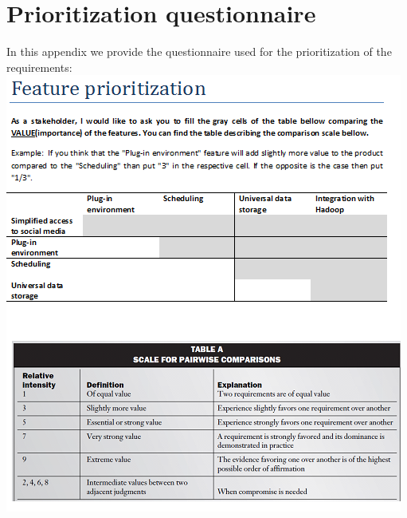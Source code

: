 
\chapter{\label{cha:priority}Prioritization questionnaire}

In this appendix we provide the questionnaire used for the prioritization of the requirements:\\

\includegraphics[scale=0.95]{apendix/prioritization/priority.png}

